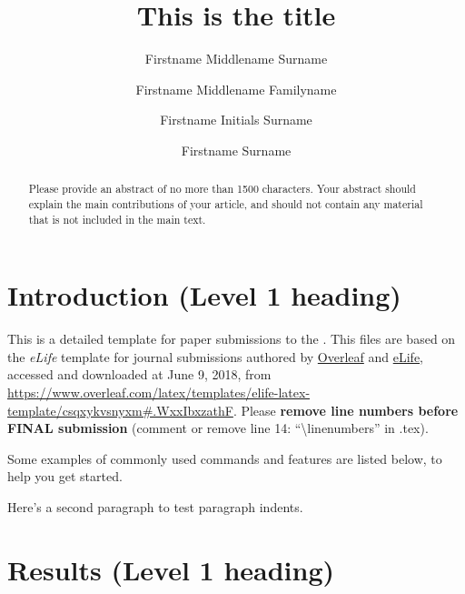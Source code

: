 \documentclass[9pt]{crone}
\title{This is the title}
\author[1*]{Firstname Middlename Surname}
\author[1,2\authfn{1}]{Firstname Middlename Familyname}
\author[2\authfn{2}]{Firstname Initials Surname}
\author[2*]{Firstname Surname}
\affil[1]{Institution 1}
\affil[2]{Institution 2}
\begin{document}
\maketitle

\begin{abstract}
Please provide an abstract of no more than 1500 characters. Your abstract should explain the main contributions of your article, and should not contain any material that is not included in the main text.
\end{abstract}


\section{Introduction (Level 1 heading)}

This is a detailed template for paper submissions to the \CRoNeVERSION{}. This files are based on the \textit{eLife} template for journal submissions authored by \href{https://www.overleaf.com}{Overleaf} and \href{https://www.elifesciences.com}{eLife}, accessed and downloaded at June 9, 2018, from \url{https://www.overleaf.com/latex/templates/elife-latex-template/csqxykvsnyxm#.WxxIbxzathF}. Please \textbf{remove line numbers before FINAL submission} (comment or remove line 14: ``\textbackslash linenumbers'' in .tex).

Some examples of commonly used commands and features are listed below, to help you get started.

Here's a second paragraph to test paragraph indents. \lipsum[1]

\section{Results (Level 1 heading)}

\lipsum[2-3]
\end{document}

